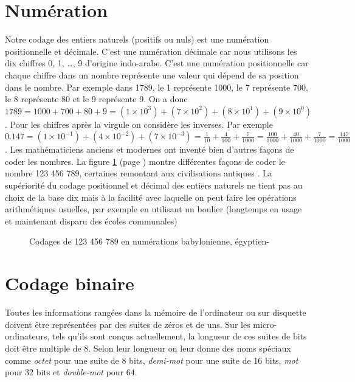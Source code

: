 \section{Numération}
Notre codage des entiers naturels (positifs ou nuls) est une numération positionnelle et décimale.
C'est une numération décimale car nous utilisons les dix chiffres 0, 1, \ldots, 9 d'origine
indo-arabe. C'est une numération positionnelle car chaque chiffre dans un nombre représente une
valeur qui dépend de sa position dans le nombre. Par exemple dans 1789, le 1 représente 1000,
le 7 représente 700, le 8 représente 80 et le 9 représente 9. On a donc $1789 = 1000 + 700
+ 80 + 9 = (1 \times 10^{3}) +  (7 \times 10^{2}) +  (8 \times 10^{1}) + (9 \times 10^{0})$.  
Pour les chiffres après la virgule on considère les inverses. Par exemple $0.147= (1\times 10^{-1})+
(4\times 10^{-2})+(7\times 10^{-3})=\frac{1}{10}+\frac{4}{100}+\frac{7}{1000}=\frac{100}{1000}+\frac{40}{1000}+\frac{7}{1000}=\frac{147}{1000}$.
Les
mathématiciens anciens et modernes ont inventé bien d'autres façons de coder les nombres. 
La figure \ref{fig:code1-9} (page \pageref{fig:code1-9}) montre différentes façons de coder le nombre
123 456 789, certaines remontant aux civilisations antiques \cite{guitel}. La supériorité du
codage positionnel et décimal des entiers naturels ne tient pas au choix de la base dix mais
à la facilité avec laquelle on peut faire les opérations
arithmétiques usuelles, par exemple en utilisant un boulier (longtemps en usage et maintenant disparu des écoles
communales)

\begin{figure}[htbp]
 \caption{Codages de 123 456 789 en numérations babylonienne, égyptien-\label{fig:code1-9}}
\end{figure}


\section{Codage binaire}

Toutes les informations rangées dans la mémoire de l'ordinateur ou sur disquette doivent
être représentées par des suites de zéros et de uns. Sur les micro-ordinateurs,
tels qu'ils sont conçus actuellement, la longueur de ces suites de bits doit être multiple
de 8. Selon leur longueur on leur donne des noms spéciaux comme {\em octet} pour une suite
de 8 bits, {\em demi-mot} pour une suite de 16 bits, {\em mot} pour 32 bits et {\em double-mot}
pour 64.

